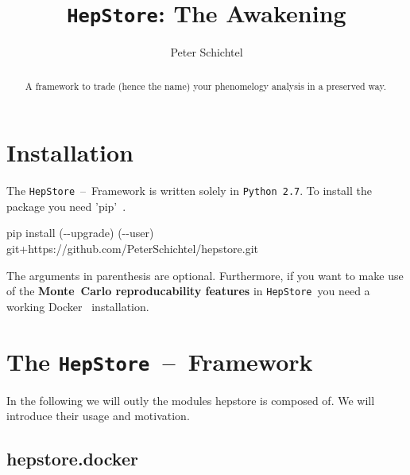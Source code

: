 \documentclass[aps,prd,11pt,tightenlines,superscriptaddress,nofootinbib,preprintnumbers,notitlepage]{revtex4-1}
\newcommand{\hepstore}{\texttt{HepStore}}
\newcommand{\python}{\texttt{Python~2.7}}
\begin{document}
 
\title{{\bf\Huge\hepstore: The Awakening}}


\author{Peter Schichtel}


\begin{abstract}
  A framework to trade (hence the name) your phenomelogy analysis in a preserved way. 
\end{abstract}

\maketitle

\bigskip 
\bigskip 

\tableofcontents 

\newpage


\section{Installation}
\label{sec:installation}

The \hepstore~--~Framework is written solely in \python. To install the package you need 'pip'~\cite{}.
%
\begin{framed}
  \begin{center}
    pip install (-{}-upgrade) (-{}-user) git+https://github.com/PeterSchichtel/hepstore.git
  \end{center}
\end{framed}
%
The arguments in parenthesis are optional. Furthermore, if you want to make use of the {\bf Monte~Carlo reproducability features} in \hepstore~you need a working Docker~\cite{} installation.

\section{The \hepstore~--~Framework}
\label{sec:framework}

In the following we will outly the modules hepstore is composed of. We will introduce their usage and motivation.

\subsection{hepstore.docker}
\end{document}
